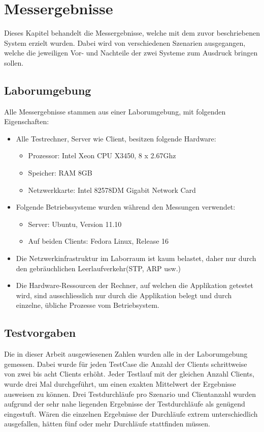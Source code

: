 \chapter{Messergebnisse}

Dieses Kapitel be\-han\-delt die Mess\-er\-geb\-nis\-se, welche mit dem zu\-vor be\-schrie\-be\-nen System erzielt wurden. Dabei wird von verschiedenen Sze\-narien aus\-ge\-gang\-en, welche die jeweiligen Vor- und Nach\-teile der zwei Sy\-stem\-e zum Ausdruck bringen sollen. 

\section{Laborumgebung}

Alle Mes\-ser\-ge\-bnis\-se stam\-men aus einer Labor\-umgebung, mit folgenden Ei\-gen\-schaf\-ten:

\begin{itemize}
\item Alle Testrechner, Server wie Client, besitzen folgende Hardware:
\begin{itemize}
\item Prozessor: Intel Xeon CPU X3450, 8 x 2.67Ghz
\item Speicher: RAM 8GB
\item Netzwerkkarte: Intel 82578DM Gigabit Network Card
\end{itemize}
\item Folgende Betriebssysteme wurden während den Messungen verwendet:
\begin{itemize}
\item Server: Ubuntu, Version 11.10
\item Auf beiden Clients: Fedora Linux, Release 16
\end{itemize}
\item Die Netzwerkinfrastruktur im Laborraum ist kaum belastet, daher nur durch den gebräuchlichen Leerlaufverkehr(\gls{STP}, \gls{ARP} usw.)
\item Die Hardware-Ressourcen der Rechner, auf welchen die Applikation getestet wird, sind ausschliesslich nur durch die Applikation belegt und durch einzelne, übliche Prozesse vom  Betriebsystem.
\end{itemize}

\section{Testvorgaben}
Die in dieser Arbeit ausgewiesenen Zahlen wurden alle in der La\-bor\-um\-gebung ge\-mes\-sen. Dabei wurde für jeden Test\-Case die An\-zahl der Clients schritt\-weise von zwei bis acht Clients erhöht. Jeder Test\-lauf mit der gleichen Anzahl Clients, wurde drei Mal durchgeführt, um einen exakten Mittel\-wert der Er\-geb\-nis\-se aus\-weisen zu können. Drei Test\-durchläufe pro Szenario und Clientanzahl wurden aufgrund der sehr nahe liegenden Er\-geb\-nis\-se der Testdurchläufe als genügend eingestuft. Wären die einzelnen Ergebnisse der Durchläufe extrem unterschiedlich ausgefallen, hätten fünf oder mehr Durchläufe stattfinden müssen.

